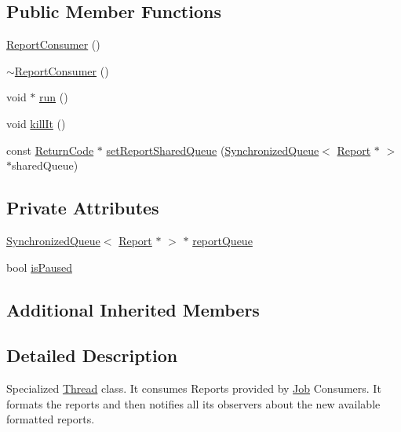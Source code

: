 \subsection*{Public Member Functions}
\begin{DoxyCompactItemize}
\item 
\hyperlink{classit_1_1testbench_1_1rte_1_1ReportConsumer_a098de1322328e807d04ed2c0feae5d4c}{Report\-Consumer} ()
\item 
\hyperlink{classit_1_1testbench_1_1rte_1_1ReportConsumer_a80f47783855d2521751ff8f7520ab234}{$\sim$\-Report\-Consumer} ()
\item 
void $\ast$ \hyperlink{classit_1_1testbench_1_1rte_1_1ReportConsumer_a59043ea752911968640216a898b981a0}{run} ()
\item 
void \hyperlink{classit_1_1testbench_1_1rte_1_1ReportConsumer_a9cb8e2e348ef8f24e381c7b511cdbbd2}{kill\-It} ()
\item 
const \hyperlink{structit_1_1testbench_1_1data_1_1ReturnCode}{Return\-Code} $\ast$ \hyperlink{classit_1_1testbench_1_1rte_1_1ReportConsumer_a8d786ee688355cf6dc45e7e0d417b6ca}{set\-Report\-Shared\-Queue} (\hyperlink{classit_1_1testbench_1_1rte_1_1SynchronizedQueue}{Synchronized\-Queue}$<$ \hyperlink{classit_1_1testbench_1_1data_1_1Report}{Report} $\ast$ $>$ $\ast$shared\-Queue)
\end{DoxyCompactItemize}
\subsection*{Private Attributes}
\begin{DoxyCompactItemize}
\item 
\hyperlink{classit_1_1testbench_1_1rte_1_1SynchronizedQueue}{Synchronized\-Queue}$<$ \hyperlink{classit_1_1testbench_1_1data_1_1Report}{Report} $\ast$ $>$ $\ast$ \hyperlink{classit_1_1testbench_1_1rte_1_1ReportConsumer_a3567bb28dc6b59ee978216fb89037a13}{report\-Queue}
\item 
bool \hyperlink{classit_1_1testbench_1_1rte_1_1ReportConsumer_a700e6c26754c6fc270aa8aef81bef405}{is\-Paused}
\end{DoxyCompactItemize}
\subsection*{Additional Inherited Members}


\subsection{Detailed Description}
Specialized \hyperlink{classit_1_1testbench_1_1rte_1_1Thread}{Thread} class. It consumes Reports provided by \hyperlink{classit_1_1testbench_1_1rte_1_1Job}{Job} Consumers. It formats the reports and then notifies all its observers about the new available formatted reports. 

